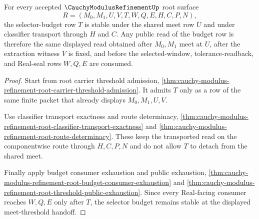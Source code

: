 \begin{theorem}
\label{thm:cauchy-modulus-refinement-root-budget-stability}
For every accepted $\CauchyModulusRefinementUp$ root surface
$$
R=(M_0,M_1,U,V,T,W,Q,E,H,C,P,N),
$$
the selector-budget row $T$ is stable under the shared meet row $U$ and under classifier transport through $H$ and $C$. Any public read of the budget row is therefore the same displayed read obtained after $M_0,M_1$ meet at $U$, after the extraction witness $V$ is fixed, and before the selected-window, tolerance-readback, and Real-seal rows $W,Q,E$ are consumed.
\end{theorem}
\begin{proof}
Start from root carrier threshold admission, \autoref{thm:cauchy-modulus-refinement-root-carrier-threshold-admission}. It admits $T$ only as a row of the same finite packet that already displays $M_0,M_1,U,V$.

Use classifier transport exactness and route determinacy, \autoref{thm:cauchy-modulus-refinement-root-classifier-transport-exactness} and \autoref{thm:cauchy-modulus-refinement-root-route-determinacy}. These keep the transported read on the componentwise route through $H,C,P,N$ and do not allow $T$ to detach from the shared meet.

Finally apply budget consumer exhaustion and public exhaustion, \autoref{thm:cauchy-modulus-refinement-root-budget-consumer-exhaustion} and \autoref{thm:cauchy-modulus-refinement-root-threshold-public-exhaustion}. Since every Real-facing consumer reaches $W,Q,E$ only after $T$, the selector budget remains stable at the displayed meet-threshold handoff.
\end{proof}


